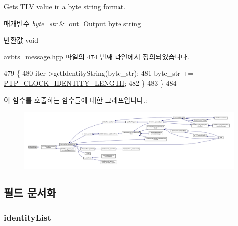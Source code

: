 Gets T\+LV value in a byte string format. 


\begin{DoxyParams}{매개변수}
{\em byte\+\_\+str} & \mbox{[}out\mbox{]} Output byte string \\
\hline
\end{DoxyParams}
\begin{DoxyReturn}{반환값}
void 
\end{DoxyReturn}


avbts\+\_\+message.\+hpp 파일의 474 번째 라인에서 정의되었습니다.


\begin{DoxyCode}
479                                                  \{
480             iter->getIdentityString(byte\_str);
481             byte\_str += \hyperlink{ptptypes_8hpp_afd1566058ed7927c2b790c9d4a0051ec}{PTP\_CLOCK\_IDENTITY\_LENGTH};
482         \}
483     \}
484 \end{DoxyCode}


이 함수를 호출하는 함수들에 대한 그래프입니다.\+:
\nopagebreak
\begin{figure}[H]
\begin{center}
\leavevmode
\includegraphics[width=350pt]{class_path_trace_t_l_v_acd2477c3b4df4f055d57ceae73e545a0_icgraph}
\end{center}
\end{figure}




\subsection{필드 문서화}
\subsubsection[{\texorpdfstring{identity\+List}{identityList}}]{ identity\+List\hspace{0.3cm}{\ttfamily [private]}}\hypertarget{class_path_trace_t_l_v_a4ad44abdc38822ab7966b4e175df0807}{}\label{class_path_trace_t_l_v_a4ad44abdc38822ab7966b4e175df0807}


